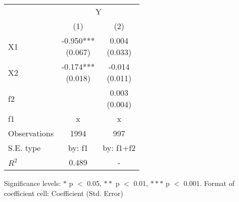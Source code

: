 \renewcommand\cellalign{t}
\begin{threeparttable}
\begin{tabular}{lcc}
\toprule
 & \multicolumn{2}{c}{Y} \\
\cmidrule(lr){2-3}
 & (1) & (2) \\
\midrule
X1 & \makecell{-0.950*** \\ (0.067)} & \makecell{0.004 \\ (0.033)} \\
X2 & \makecell{-0.174*** \\ (0.018)} & \makecell{-0.014 \\ (0.011)} \\
f2 &  & \makecell{0.003 \\ (0.004)} \\
\midrule
f1 & x & x \\
\midrule
Observations & 1994 & 997 \\
S.E. type & by: f1 & by: f1+f2 \\
$R^2$ & 0.489 & - \\
\bottomrule
\end{tabular}
\footnotesize Significance levels: $*$ p $<$ 0.05, $**$ p $<$ 0.01, $***$ p $<$ 0.001. Format of coefficient cell: Coefficient
 (Std. Error)
\end{threeparttable}
